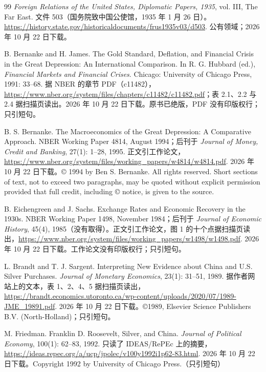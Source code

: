 \begin{thebibliography}{99}
 \emph{Foreign Relations of the United States, Diplomatic Papers, 1935}, vol. III, The Far East. 文件 503（国务院致中国公使馆，1935 年 1 月 26 日）。\url{https://history.state.gov/historicaldocuments/frus1935v03/d503}. 公有领域；2026 年 10 月 22 日下载。

 B. Bernanke and H. James. The Gold Standard, Deflation, and Financial Crisis in the Great Depression: An International Comparison. In R. G. Hubbard (ed.), \emph{Financial Markets and Financial Crises}. Chicago: University of Chicago Press, 1991: 33--68. 据 NBER 的章节 PDF（c11482），\url{https://www.nber.org/system/files/chapters/c11482/c11482.pdf}；表 2.1、2.2 与 2.4 据扫描页读出。2026 年 10 月 22 日下载。原书已绝版，PDF 没有印版权行；只引短句。

 B. S. Bernanke. The Macroeconomics of the Great Depression: A Comparative Approach. NBER Working Paper 4814, August 1994；后刊于 \emph{Journal of Money, Credit and Banking}, 27(1): 1--28, 1995. 正文引工作论文，\url{https://www.nber.org/system/files/working_papers/w4814/w4814.pdf}. 2026 年 10 月 22 日下载。© 1994 by Ben S. Bernanke. All rights reserved. Short sections of text, not to exceed two paragraphs, may be quoted without explicit permission provided that full credit, including © notice, is given to the source.

 B. Eichengreen and J. Sachs. Exchange Rates and Economic Recovery in the 1930s. NBER Working Paper 1498, November 1984；后刊于 \emph{Journal of Economic History}, 45(4), 1985（没有取得）。正文引工作论文，图 1 的十个点据扫描页读出，\url{https://www.nber.org/system/files/working_papers/w1498/w1498.pdf}. 2026 年 10 月 22 日下载。工作论文没有印版权行；只引短句。

 L. Brandt and T. J. Sargent. Interpreting New Evidence about China and U.S. Silver Purchases. \emph{Journal of Monetary Economics}, 23(1): 31--51, 1989. 据作者网站上的文本，表 1、2、4、5 据扫描页读出，\url{https://brandt.economics.utoronto.ca/wp-content/uploads/2020/07/1989-JME_19891.pdf}. 2026 年 10 月 22 日下载。©1989, Elsevier Science Publishers B.V. (North-Holland)；只引短句。

 M. Friedman. Franklin D. Roosevelt, Silver, and China. \emph{Journal of Political Economy}, 100(1): 62--83, 1992. 只读了 IDEAS/RePEc 上的摘要，\url{https://ideas.repec.org/a/ucp/jpolec/v100y1992i1p62-83.html}. 2026 年 10 月 22 日下载。Copyright 1992 by University of Chicago Press.（只引短句）


\end{thebibliography}
